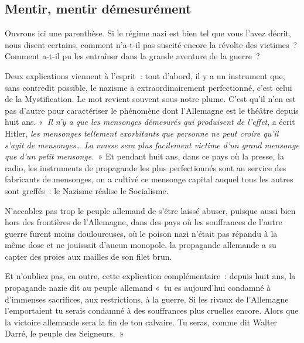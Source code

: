 \documentclass[french,twoside]{book} %
\begin{document}
\subsection[Mentir, mentir démesurément]{Mentir, mentir démesurément}
\noindent Ouvrons ici une parenthèse. Si le régime nazi est bien tel que vous l’avez décrit, nous disent certains, comment n’a-t-il pas suscité encore la révolte des victimes ? Comment a-t-il pu les entraîner dans la grande aventure de la guerre ?\par
Deux explications viennent à l’esprit : tout d’abord, il y a un instrument que, sans contredit possible, le nazisme a extraordinairement perfectionné, c’est celui de la Mystification. Le mot revient souvent sous notre plume. C’est qu’il n’en est pas d’autre pour caractériser le phénomène dont l’Allemagne est le théâtre depuis huit ans. « \emph{Il n’y a que les mensonges démesurés qui produisent de l’effet}, a écrit Hitler, \emph{les mensonges tellement exorbitants que personne ne peut croire qu’il s’agit de mensonges… La masse sera plus facilement victime d’un grand mensonge que d’un petit mensonge.} » Et pendant huit ans, dans ce pays où la presse, la radio, les instruments de propagande les plus perfectionnés sont au service des fabricants de mensonges, on a cultivé ce mensonge capital auquel tous les autres sont greffés : le Nazisme réalise le Socialisme.\par
N’accablez pas trop le peuple allemand de s’être laissé abuser, puisque aussi bien hors des frontières de l’Allemagne, dans des pays où les souffrances de l’autre guerre furent moins douloureuses, où le poison nazi n’était pas répandu à la même dose et ne jouissait d’aucun monopole, la propagande allemande a su capter des proies aux mailles de son filet brun.\par
Et n’oubliez pas, en outre, cette explication complémentaire : depuis huit ans, la propagande nazie dit au peuple allemand « tu es aujourd’hui condamné à d’immenses sacrifices, aux restrictions, à la guerre. Si les rivaux de l’Allemagne l’emportaient tu serais condamné à des souffrances plus cruelles encore. Alors que la victoire allemande sera la fin de ton calvaire. Tu seras, comme dit Walter Darré, le peuple des Seigneurs. »
\end{document}
